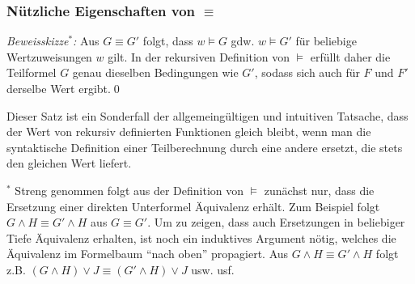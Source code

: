 \documentclass[aspectratio=1610,onlymath]{beamer}
\begin{document}
\begin{frame}\frametitle{Nützliche Eigenschaften von $\equiv$}

% 


\pause

\emph{Beweisskizze${}^*$:} Aus $G\equiv G'$ folgt, dass $w\models G$ gdw. $w\models G'$ für beliebige Wertzuweisungen $w$ gilt.
In der rekursiven Definition von $\models$ erfüllt daher die Teilformel $G$ genau dieselben Bedingungen wie $G'$, sodass sich auch für $F$ und $F'$ derselbe Wert ergibt.\qed
\bigskip

Dieser Satz ist ein Sonderfall der allgemeingültigen und intuitiven Tatsache, dass der Wert von rekursiv definierten Funktionen gleich bleibt, wenn man die syntaktische Definition einer Teilberechnung durch eine andere ersetzt, die stets den gleichen Wert liefert.
\bigskip


{\tiny ${}^*$ Streng genommen folgt aus der Definition von $\models$ zunächst nur, dass die Ersetzung einer direkten Unterformel
Äquivalenz erhält. Zum Beispiel folgt $G\wedge H\equiv G'\wedge H$ aus $G\equiv G'$. Um zu zeigen, dass auch Ersetzungen in beliebiger Tiefe Äquivalenz erhalten, ist noch ein induktives Argument nötig, welches die Äquivalenz im Formelbaum "`nach oben"' propagiert. Aus $G\wedge H\equiv G'\wedge H$ folgt z.B. $(G\wedge H)\vee J\equiv (G'\wedge H)\vee J$ usw. usf.
}

\end{frame}
\end{document}
